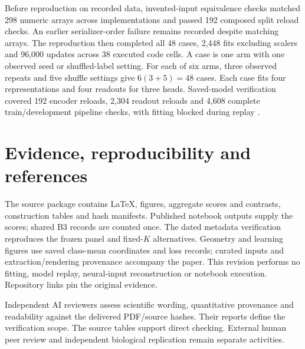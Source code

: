 \documentclass[10pt,a4paper]{article}
\begin{document}
Before reproduction on recorded data, invented-input equivalence checks matched 298 numeric arrays across implementations and passed 192 composed split reload checks. An earlier serializer-order failure remains recorded despite matching arrays. The reproduction then completed all 48 cases, 2,448 fits excluding scalers and 96,000 updates across 38 executed code cells. A case is one arm with one observed seed or shuffled-label setting. For each of six arms, three observed repeats and five shuffle settings give $6(3+5)=48$ cases. Each case fits four representations and four readouts for three heads. Saved-model verification covered 192 encoder reloads, 2,304 readout reloads and 4,608 complete train/development pipeline checks, with fitting blocked during replay \cite{reproduction}.

\clearpage
\section*{Evidence, reproducibility and references}
The source package contains LaTeX, figures, aggregate scores and contrasts, construction tables and hash manifests. Published notebook outputs supply the scores; shared B3 records are counted once. The dated metadata verification reproduces the frozen panel and fixed-$K$ alternatives. Geometry and learning figures use saved class-mean coordinates and loss records; curated inputs and extraction/rendering provenance accompany the paper. This revision performs no fitting, model replay, neural-input reconstruction or notebook execution. Repository links pin the original evidence.

Independent AI reviewers assess scientific wording, quantitative provenance and readability against the delivered PDF/source hashes. Their reports define the verification scope. The source tables support direct checking. External human peer review and independent biological replication remain separate activities.
\end{document}
